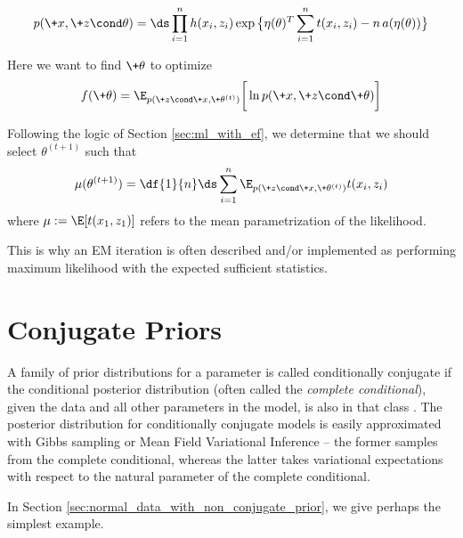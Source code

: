 \documentclass{article} %
\begin{document}
\begin{align}
\label{eqn:exponential_family_complete_data_likelihood}
 p(\+x, \+z \cond \theta) = \ds\prod_{i=1}^n h(x_i, z_i) \exp \big\{ \eta(\theta)^T \sum_{i=1}^n t(x_i, z_i) - n \,a(\eta(\theta))\big\} 
 \end{align}

Here we want to find $\+\theta$ to optimize 
\[ f(\+\theta) =  \E_{p(\+z \cond \+x , \+\theta^{(t)})} \bigg[ \ln p(\+x, \+z \cond \+\theta) \bigg] \]

Following the logic of Section \ref{sec:ml_with_ef}, we determine that we should select $\theta^{(t+1)}$ such that
\[ \mu(\theta^{(t+1)}) = \df{1}{n} \ds\sum_{i=1}^n   \E_{p(\+z \cond \+x , \+\theta^{(t)})} t(x_i, z_i) \]
where $\mu := \E[t(x_1,z_1)]$ refers to the mean parametrization of the likelihood.

This is why an EM iteration is often described and/or implemented as performing maximum likelihood with the expected sufficient statistics.


 
 \section{Conjugate Priors} \label{sec:conjugate_exponential_family_models}
 

\begin{remark}{}
\label{rk:exponential_family_conditional_conjugacy} A family of prior distributions for a parameter is called conditionally conjugate if the conditional posterior distribution (often called the \textit{complete conditional}),  given the data and all other parameters in the model,  is also in that class  \cite{gelman2006prior}.    The posterior distribution for conditionally conjugate models is easily approximated with Gibbs sampling or Mean Field Variational Inference -- the former samples from the complete conditional,  whereas the latter takes variational expectations with respect to the natural parameter of the complete conditional.

In Section \ref{sec:normal_data_with_non_conjugate_prior}, we give perhaps the simplest example. 
\end{remark}
 
\end{document}
